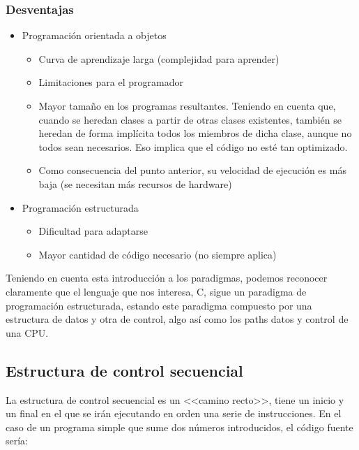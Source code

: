 \documentclass[a4paper, 11pt, titlepage]{article}
\begin{document}
    \subsubsection{Desventajas}
    \begin{itemize}
        \item Programación orientada a objetos
        \begin{itemize}
            \item Curva de aprendizaje larga (complejidad para aprender)
            \item Limitaciones para el programador
            \item Mayor tamaño en los programas resultantes. Teniendo en cuenta
            que, cuando se heredan clases a partir de otras clases existentes, 
            también se heredan de forma implícita todos los miembros de dicha 
            clase, aunque no todos sean necesarios. Eso implica que el código 
            no esté tan optimizado.
            \item Como consecuencia del punto anterior, su velocidad de ejecución 
            es más baja (se necesitan más recursos de hardware)
        \end{itemize}
        \item Programación estructurada
        \begin{itemize}
            \item Dificultad para adaptarse
            \item Mayor cantidad de código necesario (no siempre aplica)
        \end{itemize}
    \end{itemize}

    Teniendo en cuenta esta introducción a los paradigmas, podemos reconocer claramente que 
    el lenguaje que nos interesa, C, sigue un paradigma de programación estructurada, estando 
    este paradigma compuesto por una estructura de datos y otra de control, algo así como los 
    paths datos y control de una CPU. %


    \subsection{Estructura de control secuencial}

        La estructura de control secuencial es un <<camino recto>>, tiene un inicio y un final en el que se 
        irán ejecutando en orden una serie de instrucciones. En el caso de un programa simple que sume dos 
        números introducidos, el código fuente sería:
\end{document}

